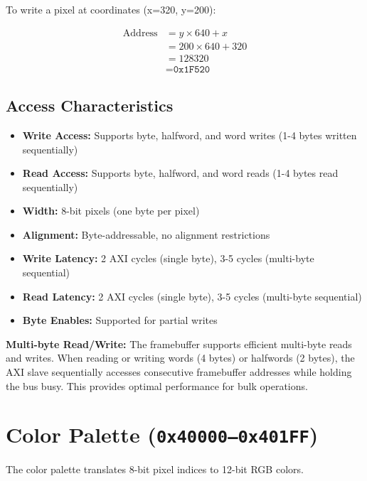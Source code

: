 \documentclass[11pt,letterpaper]{report}
\begin{document}
To write a pixel at coordinates (x=320, y=200):

\begin{equation}
\begin{aligned}
\text{Address} &= y \times 640 + x \\
               &= 200 \times 640 + 320 \\
               &= 128320 \\
               &= \texttt{0x1F520}
\end{aligned}
\end{equation}

\subsection{Access Characteristics}

\begin{itemize}
    \item \textbf{Write Access:} Supports byte, halfword, and word writes (1-4 bytes written sequentially)
    \item \textbf{Read Access:} Supports byte, halfword, and word reads (1-4 bytes read sequentially)
    \item \textbf{Width:} 8-bit pixels (one byte per pixel)
    \item \textbf{Alignment:} Byte-addressable, no alignment restrictions
    \item \textbf{Write Latency:} 2 AXI cycles (single byte), 3-5 cycles (multi-byte sequential)
    \item \textbf{Read Latency:} 2 AXI cycles (single byte), 3-5 cycles (multi-byte sequential)
    \item \textbf{Byte Enables:} Supported for partial writes
\end{itemize}

\textbf{Multi-byte Read/Write:} The framebuffer supports efficient multi-byte reads and writes. When reading or writing words (4 bytes) or halfwords (2 bytes), the AXI slave sequentially accesses consecutive framebuffer addresses while holding the bus busy. This provides optimal performance for bulk operations.

\section{Color Palette (\texttt{0x40000--0x401FF})}

The color palette translates 8-bit pixel indices to 12-bit RGB colors.
\end{document}
